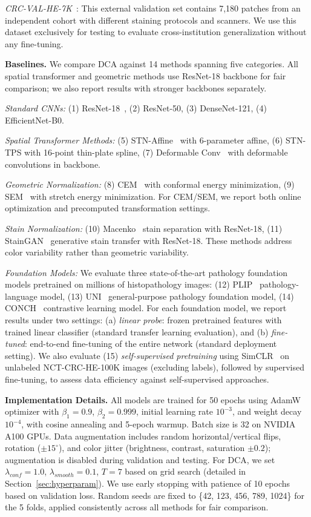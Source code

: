 \documentclass[final,3p,times,review,sort&compress]{elsarticle}
\begin{document}
\textit{CRC-VAL-HE-7K}~\cite{nct_dataset}: This external validation set contains 7,180 patches from an independent cohort with different staining protocols and scanners. We use this dataset exclusively for testing to evaluate cross-institution generalization without any fine-tuning.

\textbf{Baselines.} We compare DCA against 14 methods spanning five categories. All spatial transformer and geometric methods use ResNet-18 backbone for fair comparison; we also report results with stronger backbones separately.

\textit{Standard CNNs:} (1) ResNet-18~\cite{he2016resnet}, (2) ResNet-50, (3) DenseNet-121, (4) EfficientNet-B0.

\textit{Spatial Transformer Methods:} (5) STN-Affine~\cite{jaderberg2015spatial} with 6-parameter affine, (6) STN-TPS with 16-point thin-plate spline, (7) Deformable Conv~\cite{dai2017deformable} with deformable convolutions in backbone.

\textit{Geometric Normalization:} (8) CEM~\cite{huang2024surface} with conformal energy minimization, (9) SEM~\cite{huang2024surface} with stretch energy minimization. For CEM/SEM, we report both online optimization and precomputed transformation settings.

\textit{Stain Normalization:} (10) Macenko~\cite{macenko2009method} stain separation with ResNet-18, (11) StainGAN~\cite{shaban2019staingan} generative stain transfer with ResNet-18. These methods address color variability rather than geometric variability.

\textit{Foundation Models:} We evaluate three state-of-the-art pathology foundation models pretrained on millions of histopathology images: (12) PLIP~\cite{huang2023plip} pathology-language model, (13) UNI~\cite{chen2024uni} general-purpose pathology foundation model, (14) CONCH~\cite{lu2024conch} contrastive learning model. For each foundation model, we report results under two settings: (a) \textit{linear probe}: frozen pretrained features with trained linear classifier (standard transfer learning evaluation), and (b) \textit{fine-tuned}: end-to-end fine-tuning of the entire network (standard deployment setting). We also evaluate (15) \textit{self-supervised pretraining} using SimCLR~\cite{chen2020simple} on unlabeled NCT-CRC-HE-100K images (excluding labels), followed by supervised fine-tuning, to assess data efficiency against self-supervised approaches.

\textbf{Implementation Details.} All models are trained for 50 epochs using AdamW optimizer with $\beta_1=0.9$, $\beta_2=0.999$, initial learning rate $10^{-3}$, and weight decay $10^{-4}$, with cosine annealing and 5-epoch warmup. Batch size is 32 on NVIDIA A100 GPUs. Data augmentation includes random horizontal/vertical flips, rotation ($\pm 15^\circ$), and color jitter (brightness, contrast, saturation $\pm 0.2$); augmentation is disabled during validation and testing. For DCA, we set $\lambda_{conf}=1.0$, $\lambda_{smooth}=0.1$, $T=7$ based on grid search (detailed in Section~\ref{sec:hyperparam}). We use early stopping with patience of 10 epochs based on validation loss. Random seeds are fixed to \{42, 123, 456, 789, 1024\} for the 5 folds, applied consistently across all methods for fair comparison. 
\end{document}
